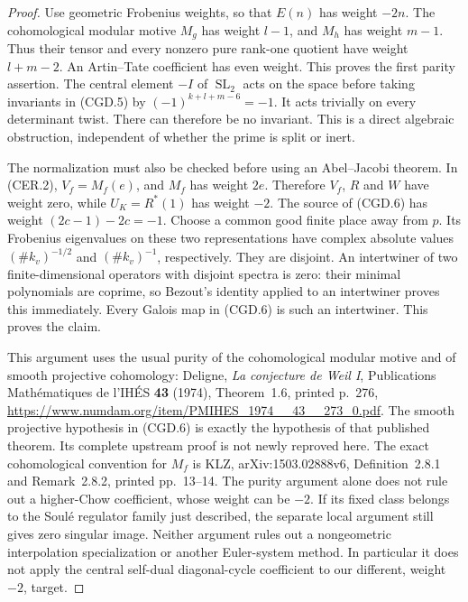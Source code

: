 \begin{proof}
Use geometric Frobenius weights, so that \(E(n)\) has
weight \(-2n\). The cohomological modular motive
\(M_g\) has weight \(l-1\), and \(M_h\) has weight
\(m-1\). Thus their tensor and every nonzero pure
rank-one quotient have weight \(l+m-2\). An Artin--Tate
coefficient has even weight. This proves the first parity
assertion. The central element \(-I\) of
\(\operatorname{SL}_2\) acts on the space before taking
invariants in (CGD.5) by
\((-1)^{k+l+m-6}=-1\). It acts trivially on every
determinant twist. There can therefore be no invariant.
This is a direct algebraic obstruction, independent of
whether the prime is split or inert.

The normalization must also be checked before using an
Abel--Jacobi theorem. In (CER.2),
\(V_f=M_f(e)\), and \(M_f\) has weight \(2e\).
Therefore \(V_f\), \(R\) and \(W\) have weight zero,
while \(U_K=R^*(1)\) has weight \(-2\).
The source of (CGD.6) has weight
\((2c-1)-2c=-1\). Choose a common good finite place
away from \(p\). Its Frobenius eigenvalues on these two
representations have complex absolute values
\((\#k_v)^{-1/2}\) and \((\#k_v)^{-1}\), respectively.
They are disjoint. An intertwiner of two finite-dimensional
operators with disjoint spectra is zero: their minimal
polynomials are coprime, so Bezout's identity applied to
an intertwiner proves this immediately. Every Galois map
in (CGD.6) is such an intertwiner. This proves the claim.

This argument uses the usual purity of the cohomological
modular motive and of smooth projective cohomology:
Deligne, \emph{La conjecture de Weil I}, Publications
Math\'ematiques de l'IH\'ES \textbf{43} (1974),
Theorem~1.6, printed p.~276,
\url{https://www.numdam.org/item/PMIHES_1974__43__273_0.pdf}.
The smooth projective hypothesis in (CGD.6) is exactly the
hypothesis of that published theorem. Its complete upstream
proof is not newly reproved here. The exact
cohomological convention for \(M_f\) is KLZ,
arXiv:1503.02888v6, Definition~2.8.1 and Remark~2.8.2,
printed pp.~13--14. The purity argument alone does not rule out a higher-Chow
coefficient, whose weight can be \(-2\). If its fixed
class belongs to the Soul\'e regulator family just described,
the separate local argument still gives zero singular image.
Neither argument rules out a nongeometric interpolation
specialization or another Euler-system method. In particular
it does not
apply the central self-dual diagonal-cycle coefficient to
our different, weight \(-2\), target.
\end{proof}

